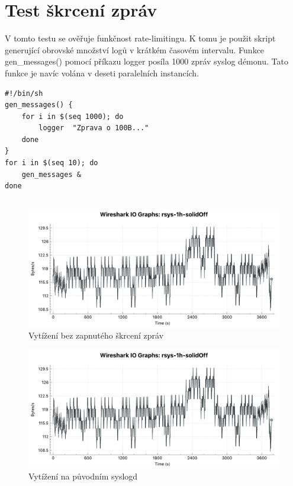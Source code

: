 \documentclass[thesis=B,czech]{FITthesis}[2012/06/26]
\begin{document}
\section{Test škrcení zpráv}
V tomto testu se ověřuje funkčnost rate-limitingu.
K tomu je použit skript generující obrovské množství logů v krátkém časovém intervalu. Funkce gen\_messages() pomocí příkazu logger posíla 1000 zpráv syslog démonu. Tato funkce je navíc volána v deseti paralelních instancích.

\begin{lstlisting}
#!/bin/sh
gen_messages() {
	for i in $(seq 1000); do
		logger 	"Zprava o 100B..."
	done
}
for i in $(seq 10); do
	gen_messages &
done
\end{lstlisting}

\subsection*{}
\begin{figure}[H]
	\centering
	\includegraphics[scale=0.44]{images/test-1h-rsys-solidoff}
	\caption[Vytížení bez zapnutého škrcení zpráv]{Vytížení bez zapnutého škrcení zpráv}
\end{figure}

\begin{figure}[H]
	\centering
	\includegraphics[scale=0.44]{images/test-1h-rsys-solidoff}
	\caption[Vytížení na původním syslogd]{Vytížení na původním syslogd}
\end{figure}
\end{document}
